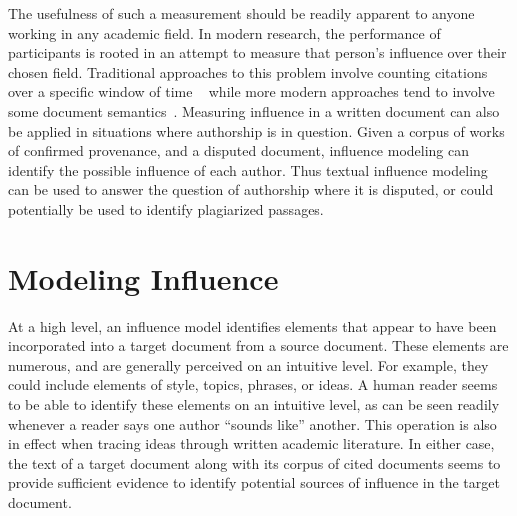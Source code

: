 \documentclass[../dissertation.tex]{subfiles}
\begin{document}
The usefulness of such a measurement should be readily apparent to
anyone working in any academic field.  In modern research, the
performance of participants is rooted in an attempt to measure that
person's influence over their chosen field.  Traditional approaches to
this problem involve counting citations over a specific window of time
~\cite{adler2009} while more modern approaches tend to involve some
document semantics~\cite{dietz2007, jiang2014}. Measuring
influence in a written document can also be applied in situations
where authorship is in question.  Given a corpus of works of confirmed
provenance, and a disputed document, influence modeling can identify
the possible influence of each author.  Thus textual influence
modeling can be used to answer the question of authorship where it is
disputed, or could potentially be used to identify plagiarized
passages.


\section{Modeling Influence}
At a high level, an influence model identifies elements that appear to
have been incorporated into a target document from a source document.
These elements are numerous, and are generally perceived on an
intuitive level.  For example, they could include elements of style,
topics, phrases, or ideas.  A human reader seems to be able to
identify these elements on an intuitive level, as can be seen readily
whenever a reader says one author ``sounds like'' another.  This
operation is also in effect when tracing ideas through written
academic literature.  In either case, the text of a target document
along with its corpus of cited documents seems to provide sufficient
evidence to identify potential sources of influence in the target
document.
\end{document}
